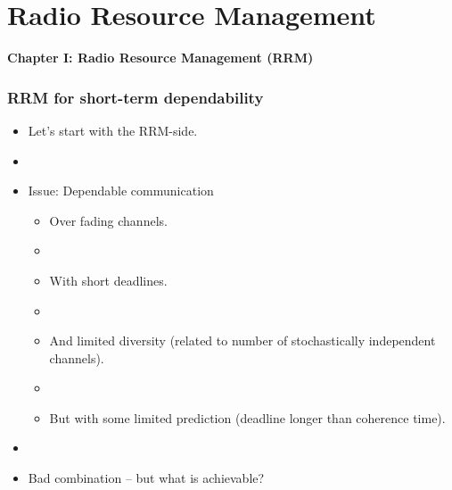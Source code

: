 \documentclass{beamer}
\begin{document}
\section{Radio Resource Management}
\begin{frame}
\centerline{\textbf{Chapter I: Radio Resource Management (RRM)}}

\end{frame}
\begin{frame}
  \frametitle{RRM for short-term dependability}
  \begin{itemize}
  
  \item Let's start with the RRM-side.
  \item[]
  \item Issue:  Dependable communication 
    \begin{itemize}
    \item Over fading channels.
    \item[]
    \item With short deadlines.
    \item[]
    \item And limited  diversity (related to number of stochastically independent channels).
    \item[]
    \item But with some limited prediction (deadline longer than
      coherence time).
    \end{itemize}
 \item[]
 \item Bad combination -- but what is achievable? 
  \end{itemize}
\end{frame}
\end{document}
